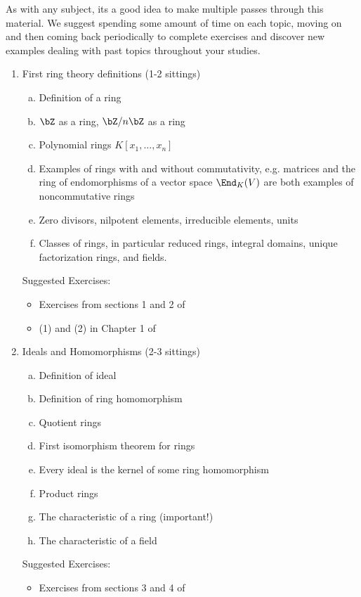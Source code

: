As with any subject, its a good idea to make multiple passes through this material. We suggest spending some amount of time on each topic, moving on and then coming back periodically to complete exercises and discover new examples dealing with past topics throughout your studies.
\begin{enumerate}[(1)]
	\item First ring theory definitions (1-2 sittings)
		\begin{enumerate}[(a)]
			\item Definition of a ring
			\item $\bZ$ as a ring, $\bZ/n\bZ$ as a ring
			\item Polynomial rings $K[x_1,...,x_n]$
			\item Examples of rings with and without commutativity, e.g. matrices and the ring of endomorphisms of a vector space $\End_K(V)$ are both examples of noncommutative rings
			\item Zero divisors, nilpotent elements, irreducible elements, units
			\item Classes of rings, in particular reduced rings, integral domains, unique factorization rings, and fields.
		\end{enumerate}
		Suggested Exercises:
		\begin{itemize}
			\item Exercises from sections 1 and 2 of \cite[Chapter 11]{artin-algebra}
			\item (1) and (2) in Chapter 1 of \cite[Chapter 1]{am}
		\end{itemize}
	\item Ideals and Homomorphisms (2-3 sittings)
		\begin{enumerate}[(a)]
			\item Definition of ideal
			\item Definition of ring homomorphism
			\item Quotient rings
			\item First isomorphism theorem for rings
			\item Every ideal is the kernel of some ring homomorphism
			\item Product rings
			\item The characteristic of a ring (important!)
			\item The characteristic of a field
		\end{enumerate}
		Suggested Exercises:
		\begin{itemize}
			\item Exercises from sections 3 and 4 of \cite[Chapter 1]{artin-algebra}

\end{itemize}
\end{enumerate}
